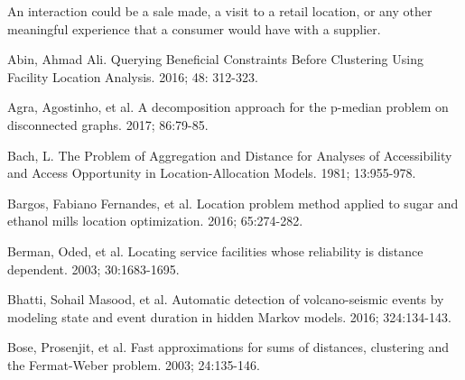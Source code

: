 \documentclass[twoside,twocolumn]{article}
\begin{document}



An interaction could be a sale made, a visit to a retail location, or any other meaningful experience that a consumer would have with a supplier. %



\begin{thebibliography}{99}

Abin, Ahmad Ali.
\newblock Querying Beneficial Constraints Before Clustering Using Facility Location Analysis.
 2016; 48: 312-323.

Agra, Agostinho, et al.
\newblock A decomposition approach for the p-median problem on disconnected graphs.
 2017; 86:79-85.

Bach, L.
\newblock The Problem of Aggregation and Distance for Analyses of Accessibility and Access Opportunity in Location-Allocation Models.
 1981; 13:955-978.

Bargos, Fabiano Fernandes, et al.
\newblock Location problem method applied to sugar and ethanol mills location optimization.
 2016; 65:274-282.

Berman, Oded, et al.
\newblock Locating service facilities whose reliability is distance dependent.
 2003; 30:1683-1695.

Bhatti, Sohail Masood, et al.
\newblock Automatic detection of volcano-seismic events by modeling state and event duration in hidden Markov models.
 2016; 324:134-143.

Bose, Prosenjit, et al.
\newblock Fast approximations for sums of distances, clustering and the Fermat-Weber problem.
 2003; 24:135-146.


\end{thebibliography}
\end{document}
